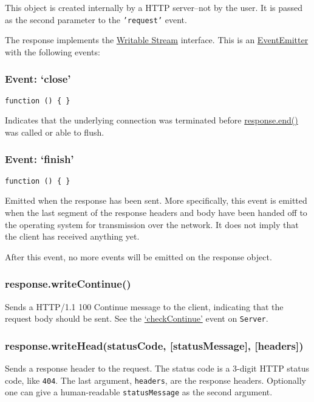 This object is created internally by a HTTP server--not by the user. It
is passed as the second parameter to the \texttt{'request'} event.

The response implements the
\href{stream.html\#stream_writable_stream}{Writable Stream} interface.
This is an
\href{events.html\#events_class_events_eventemitter}{EventEmitter} with
the following events:

\subsubsection{Event: `close'}\label{event-close-1}

\texttt{function () \{ \}}

Indicates that the underlying connection was terminated before
\hyperref[httpux5fresponseux5fendux5fdataux5fencoding]{response.end()}
was called or able to flush.

\subsubsection{Event: `finish'}\label{event-finish}

\texttt{function () \{ \}}

Emitted when the response has been sent. More specifically, this event
is emitted when the last segment of the response headers and body have
been handed off to the operating system for transmission over the
network. It does not imply that the client has received anything yet.

After this event, no more events will be emitted on the response object.

\subsubsection{response.writeContinue()}\label{response.writecontinue}

Sends a HTTP/1.1 100 Continue message to the client, indicating that the
request body should be sent. See the
\hyperref[httpux5feventux5fcheckcontinue]{`checkContinue'} event on
\texttt{Server}.

\subsubsection{response.writeHead(statusCode, {[}statusMessage{]},
{[}headers{]})}\label{response.writeheadstatuscode-statusmessage-headers}

Sends a response header to the request. The status code is a 3-digit
HTTP status code, like \texttt{404}. The last argument,
\texttt{headers}, are the response headers. Optionally one can give a
human-readable \texttt{statusMessage} as the second argument.

